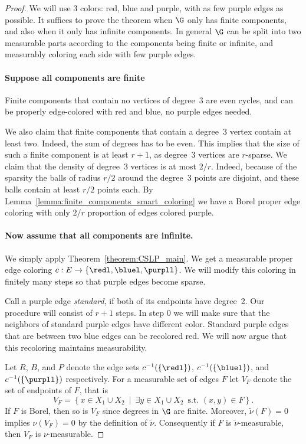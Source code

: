 \begin{proof}
We will use 3 colors: red, blue and purple, with as few purple edges as possible. It suffices to prove the theorem when $\G$ only has finite components, and also when it only has infinite components. In general $\G$ can be split into two measurable parts according to the components being finite or infinite, and measurably coloring each side with few purple edges.


\paragraph{Suppose all components are finite} Finite components that contain no vertices of degree~3 are even cycles, and can be properly edge-colored with red and blue, no purple edges needed.

We also claim that finite components that contain a degree~3 vertex contain at least two. Indeed, the sum of degrees has to be even. This implies that the size of such a finite component is at least $r+1$, as degree~3 vertices are $r$-sparse. We claim that the density of degree~3 vertices is at most $2/r$. Indeed, because of the sparsity the balls of radius $r/2$ around the degree~3 points are disjoint, and these balls contain at least $r/2$ points each. By Lemma~\ref{lemma:finite_components_smart_coloring} we have a Borel proper edge coloring with only $2/r$ proportion of edges colored purple.


\paragraph{Now assume that all components are infinite.}
We simply apply Theorem~\ref{theorem:CSLP_main}. We get a measurable proper edge coloring $c:E \to \{\redl, \bluel, \purpll\}$. We will modify this coloring in finitely many steps so that purple edges become sparse.

Call a purple edge \emph{standard}, if both of its endpoints have degree~2. Our procedure will consist of $r+1$ steps. In step 0 we will make sure that the neighbors of standard purple edges have different color. Standard purple edges that are between two blue edges can be recolored red. We will now argue that this recoloring maintains measurability.

Let $R$, $B$, and $P$ denote the edge sets $c^{-1}(\{\redl\})$, $c^{-1}(\{\bluel\})$, and $c^{-1}(\{\purpll\})$ respectively. For a measurable set of edges $F$ let $V_F$ denote the set of endpoints of $F$, that is
\[
V_F=\left\{x \in X_1 \cup X_2~\middle|~\exists y \in X_1 \cup X_2\, \text{ s.t. } (x,y) \in F\right\}.
\]
If $F$ is Borel, then so is $V_F$ since degrees in $\G$ are finite. Moreover, $\widetilde{\nu}(F)=0$ implies $\nu(V_F)=0$ by the definition of $\widetilde{\nu}$. Consequently if $F$ is $\widetilde{\nu}$-measurable, then $V_F$ is $\nu$-measurable.


\end{proof}
